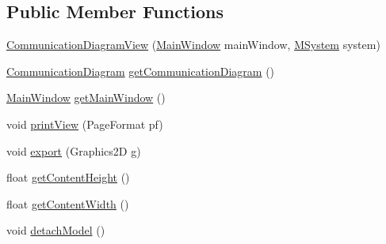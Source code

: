 \subsection*{Public Member Functions}
\begin{DoxyCompactItemize}
\item 
\hyperlink{classorg_1_1tzi_1_1use_1_1gui_1_1views_1_1diagrams_1_1behavior_1_1communicationdiagram_1_1_communication_diagram_view_a7bd73c576a67f265c7fc3e7aee5cb430}{Communication\-Diagram\-View} (\hyperlink{classorg_1_1tzi_1_1use_1_1gui_1_1main_1_1_main_window}{Main\-Window} main\-Window, \hyperlink{classorg_1_1tzi_1_1use_1_1uml_1_1sys_1_1_m_system}{M\-System} system)
\item 
\hyperlink{classorg_1_1tzi_1_1use_1_1gui_1_1views_1_1diagrams_1_1behavior_1_1communicationdiagram_1_1_communication_diagram}{Communication\-Diagram} \hyperlink{classorg_1_1tzi_1_1use_1_1gui_1_1views_1_1diagrams_1_1behavior_1_1communicationdiagram_1_1_communication_diagram_view_aff44fa9d21bcd31d176673b39277ba8d}{get\-Communication\-Diagram} ()
\item 
\hyperlink{classorg_1_1tzi_1_1use_1_1gui_1_1main_1_1_main_window}{Main\-Window} \hyperlink{classorg_1_1tzi_1_1use_1_1gui_1_1views_1_1diagrams_1_1behavior_1_1communicationdiagram_1_1_communication_diagram_view_abf8d5b85b7596f5ee83c48d7bf06180d}{get\-Main\-Window} ()
\item 
void \hyperlink{classorg_1_1tzi_1_1use_1_1gui_1_1views_1_1diagrams_1_1behavior_1_1communicationdiagram_1_1_communication_diagram_view_acb971c8fb2cf8cc31523a8fd7d27de64}{print\-View} (Page\-Format pf)
\item 
void \hyperlink{classorg_1_1tzi_1_1use_1_1gui_1_1views_1_1diagrams_1_1behavior_1_1communicationdiagram_1_1_communication_diagram_view_a1fe520147f7fa2b2922f14880bb7befe}{export} (Graphics2\-D g)
\item 
float \hyperlink{classorg_1_1tzi_1_1use_1_1gui_1_1views_1_1diagrams_1_1behavior_1_1communicationdiagram_1_1_communication_diagram_view_a449533ad1ad290860f3d0663db87c0d7}{get\-Content\-Height} ()
\item 
float \hyperlink{classorg_1_1tzi_1_1use_1_1gui_1_1views_1_1diagrams_1_1behavior_1_1communicationdiagram_1_1_communication_diagram_view_a3a116d7d66b6958384cbbf938096d8ba}{get\-Content\-Width} ()
\item 
void \hyperlink{classorg_1_1tzi_1_1use_1_1gui_1_1views_1_1diagrams_1_1behavior_1_1communicationdiagram_1_1_communication_diagram_view_a6b1d8a4809f15a2c7ba103d50b598d08}{detach\-Model} ()
\item 

\end{DoxyCompactItemize}

